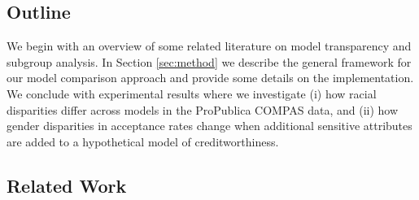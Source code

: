 \documentclass[11pt, sigconf, svgnames]{acmart}
\begin{document}


%

\vspace{-0.6em}

\subsection{Outline}

We begin with an overview of some related literature on model transparency and subgroup analysis.  In Section \ref{sec:method} we describe the general framework for our model comparison approach and provide some details on the implementation.  We conclude with experimental results where we investigate (i) how racial disparities differ across models in the ProPublica COMPAS data, and (ii) how gender disparities in acceptance rates change when additional sensitive attributes are added to a hypothetical model of creditworthiness.

\vspace{-0.6em}

\subsection{Related Work}
\end{document}
